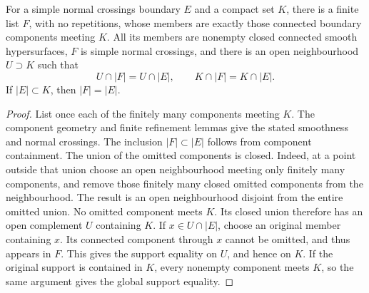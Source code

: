 \begin{theorem}
\label{hir:compact-connected-boundary-refinement}
\leanok
For a simple normal crossings boundary \(E\) and a compact set \(K\), there
is a finite list \(F\), with no repetitions, whose members are exactly those
connected boundary components meeting \(K\). All its members are nonempty
closed connected smooth hypersurfaces, \(F\) is simple normal crossings, and
there is an open neighbourhood \(U\supset K\) such that
\[
 U\cap |F|=U\cap |E|,
 \qquad K\cap |F|=K\cap |E|.
\]
If \(|E|\subset K\), then \(|F|=|E|\).
\end{theorem}
\begin{proof}
List once each of the finitely many components meeting \(K\). The component
geometry and finite refinement lemmas give the stated smoothness and normal
crossings. The inclusion \(|F|\subset|E|\) follows from component containment.
The union of the omitted components is closed. Indeed, at a point outside
that union choose an open neighbourhood meeting only finitely many components,
and remove those finitely many closed omitted components from the neighbourhood.
The result is an open neighbourhood disjoint from the entire omitted union.
No omitted component meets \(K\). Its closed union therefore has an open
complement \(U\) containing \(K\). If \(x\in U\cap|E|\), choose an
original member containing \(x\). Its connected component through \(x\)
cannot be omitted, and thus appears in \(F\). This gives the support equality
on \(U\), and hence on \(K\). If the original support is contained in
\(K\), every nonempty component meets \(K\), so the same argument gives
the global support equality.
\end{proof}

